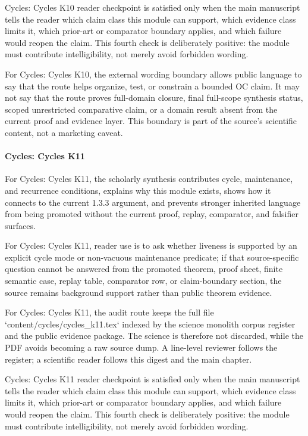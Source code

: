 Cycles: Cycles K10 reader checkpoint is satisfied only when the main manuscript tells the reader which claim class this module can support, which evidence class limits it, which prior-art or comparator boundary applies, and which failure would reopen the claim. This fourth check is deliberately positive: the module must contribute intelligibility, not merely avoid forbidden wording.


For Cycles: Cycles K10, the external wording boundary allows public language to say that the route helps organize, test, or constrain a bounded OC claim. It may not say that the route proves full-domain closure, final full-scope synthesis status, scoped unrestricted comparative claim, or a domain result absent from the current proof and evidence layer. This boundary is part of the source's scientific content, not a marketing caveat.


\paragraph{Cycles: Cycles K11}

For Cycles: Cycles K11, the scholarly synthesis contributes cycle, maintenance, and recurrence conditions, explains why this module exists, shows how it connects to the current 1.3.3 argument, and prevents stronger inherited language from being promoted without the current proof, replay, comparator, and falsifier surfaces.


For Cycles: Cycles K11, reader use is to ask whether liveness is supported by an explicit cycle mode or non-vacuous maintenance predicate; if that source-specific question cannot be answered from the promoted theorem, proof sheet, finite semantic case, replay table, comparator row, or claim-boundary section, the source remains background support rather than public theorem evidence.


For Cycles: Cycles K11, the audit route keeps the full file `content/cycles/cycles\_k11.tex` indexed by the science monolith corpus register and the public evidence package. The science is therefore not discarded, while the PDF avoids becoming a raw source dump. A line-level reviewer follows the register; a scientific reader follows this digest and the main chapter.


Cycles: Cycles K11 reader checkpoint is satisfied only when the main manuscript tells the reader which claim class this module can support, which evidence class limits it, which prior-art or comparator boundary applies, and which failure would reopen the claim. This fourth check is deliberately positive: the module must contribute intelligibility, not merely avoid forbidden wording.



